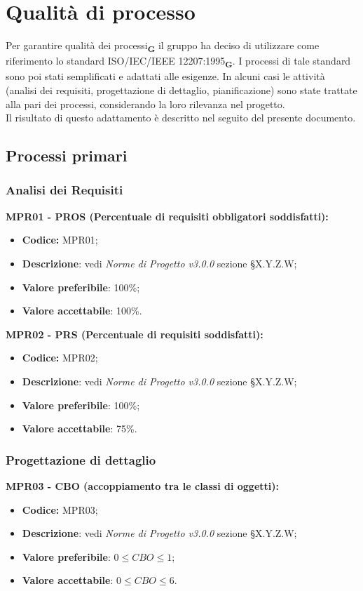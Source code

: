 \section{Qualità di processo}
Per garantire qualità dei processi\textsubscript{\textbf{G}} il gruppo ha deciso di utilizzare come riferimento lo standard ISO/IEC/IEEE 12207:1995\textsubscript{\textbf{G}}.
I processi di tale standard sono poi stati semplificati e adattati alle esigenze. 
In alcuni casi le attività (analisi dei requisiti, progettazione di dettaglio, pianificazione) sono state trattate alla pari dei processi, considerando la loro rilevanza nel progetto.\\Il risultato di questo adattamento è descritto nel seguito del presente documento.
\subsection{Processi primari}
\subsubsection{Analisi dei Requisiti}
\textbf{MPR01 - PROS (Percentuale di requisiti obbligatori soddisfatti):}
\begin{itemize}
    \item \textbf{Codice:} MPR01;
    \item \textbf{Descrizione}: vedi \textit{Norme di Progetto v3.0.0} sezione \S X.Y.Z.W;
    \item \textbf{Valore preferibile}: 100\%;
    \item \textbf{Valore accettabile}: 100\%.
\end{itemize}
\textbf{MPR02 - PRS (Percentuale di requisiti soddisfatti):}
\begin{itemize}
    \item \textbf{Codice:} MPR02;
    \item \textbf{Descrizione}: vedi \textit{Norme di Progetto v3.0.0} sezione \S X.Y.Z.W;
    \item \textbf{Valore preferibile}: 100\%;
    \item \textbf{Valore accettabile}: 75\%.
\end{itemize}
\subsubsection{Progettazione di dettaglio}
\textbf{MPR03 - CBO (accoppiamento tra le classi di oggetti):}
\begin{itemize}
    \item \textbf{Codice:} MPR03;
    \item \textbf{Descrizione}: vedi \textit{Norme di Progetto v3.0.0} sezione \S X.Y.Z.W;
    \item \textbf{Valore preferibile}: $0 \leq CBO \leq 1$;
    \item \textbf{Valore accettabile}: $0 \leq CBO \leq 6$.
\end{itemize}
